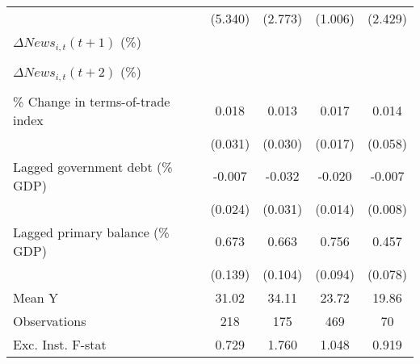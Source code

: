 {\begin{tabular}{l*{4}{c}}
                    &     (5.340)         &     (2.773)         &     (1.006)         &     (2.429)         \\
\addlinespace
$ \Delta News_{i,t}(t+1)$ (\%)&                     &                     &                     &                     \\
                    &                     &                     &                     &                     \\
\addlinespace
$ \Delta News_{i,t}(t+2)$ (\%)&                     &                     &                     &                     \\
                    &                     &                     &                     &                     \\
\addlinespace
\% Change in terms-of-trade index&       0.018         &       0.013         &       0.017         &       0.014         \\
                    &     (0.031)         &     (0.030)         &     (0.017)         &     (0.058)         \\
\addlinespace
Lagged government debt (\% GDP)&      -0.007         &      -0.032         &      -0.020         &      -0.007         \\
                    &     (0.024)         &     (0.031)         &     (0.014)         &     (0.008)         \\
\addlinespace
Lagged primary balance (\% GDP)&       0.673\sym{***}&       0.663\sym{***}&       0.756\sym{***}&       0.457\sym{***}\\
                    &     (0.139)         &     (0.104)         &     (0.094)         &     (0.078)         \\
\midrule
Mean Y              &       31.02         &       34.11         &       23.72         &       19.86         \\
Observations        &         218         &         175         &         469         &          70         \\
Exc. Inst. F-stat   &       0.729         &       1.760         &       1.048         &       0.919         \\
\bottomrule
\end{tabular}
}
